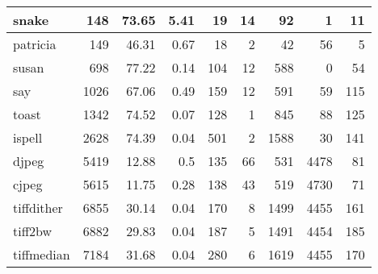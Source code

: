 \begin{tabular}{l|r|r|r|r|r|r|r|r}
 \hline
 snake           &      148 &    73.65 &   5.41 &   19 &   14 &     92 &     1 &    11 \\
 \hline
 patricia        &      149 &    46.31 &   0.67 &   18 &    2 &     42 &    56 &     5 \\
 \hline
 susan           &      698 &    77.22 &   0.14 &  104 &   12 &    588 &     0 &    54 \\
 \hline
 say             &     1026 &    67.06 &   0.49 &  159 &   12 &    591 &    59 &   115 \\
 \hline
 toast           &     1342 &    74.52 &   0.07 &  128 &    1 &    845 &    88 &   125 \\
 \hline
 ispell          &     2628 &    74.39 &   0.04 &  501 &    2 &   1588 &    30 &   141 \\
 \hline
 djpeg           &     5419 &    12.88 &   0.5  &  135 &   66 &    531 &  4478 &    81 \\
 \hline
 cjpeg           &     5615 &    11.75 &   0.28 &  138 &   43 &    519 &  4730 &    71 \\
 \hline
 tiffdither      &     6855 &    30.14 &   0.04 &  170 &    8 &   1499 &  4455 &   161 \\
 \hline
 tiff2bw         &     6882 &    29.83 &   0.04 &  187 &    5 &   1491 &  4454 &   185 \\
 \hline
 tiffmedian      &     7184 &    31.68 &   0.04 &  280 &    6 &   1619 &  4455 &   170 \\
\hline
\end{tabular}

